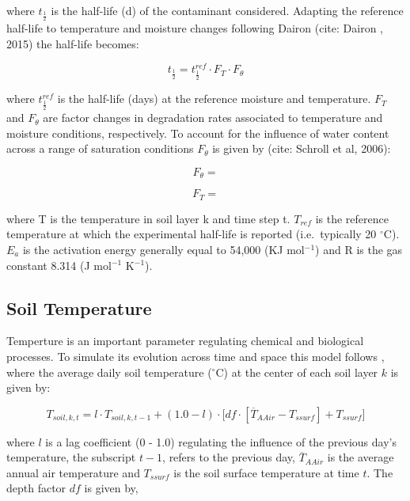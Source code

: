 \documentclass[]{article}
\begin{document}
where \(t_\frac{1}{2}\) is the half-life (d) of the contaminant
considered. Adapting the reference half-life to temperature and moisture
changes following Dairon (cite: Dairon , 2015) the half-life becomes:

\begin{equation}
t_\frac{1}{2}=t_\frac{1}{2}^{ref}\cdot F_T \cdot F_\theta
\label{eq:DT50} 
\end{equation}

where \(t_\frac{1}{2}^{ref}\) is the half-life (days) at the reference
moisture and temperature. \(F_T\) and \(F_\theta\) are factor changes in
degradation rates associated to temperature and moisture conditions,
respectively. To account for the influence of water content across a
range of saturation conditions \(F_\theta\) is given by (cite: Schroll
et al, 2006):

\begin{equation} 
F_\theta = 
\end{equation}

\begin{equation} 
F_T =
\end{equation}

where T is the temperature in soil layer k and time step t. \(T_{ref}\)
is the reference temperature at which the experimental half-life is
reported (i.e.~typically 20 \(^{\circ}\)C). \(E_a\) is the activation
energy generally equal to 54,000 (KJ mol\(^{-1}\)) and R is the gas
constant 8.314 (J mol\(^{-1}\) K\(^{-1}\)).

\subsection{Soil Temperature}\label{soil-temperature}

Temperture is an important parameter regulating chemical and biological
processes. To simulate its evolution across time and space this model
follows \citep{Neitsch2009}, where the average daily soil temperature
(\(^{\circ}\)C) at the center of each soil layer \(k\) is given by:

\begin{equation}
T_{soil, k, t} = l \cdot T_{soil, k, t-1} + (1.0 - l) \cdot \big[df \cdot [\overline{T}_{AAir} - T_{ssurf}]+T_{ssurf}]
\label{eq:tempSoil} 
\end{equation}

where \(l\) is a lag coefficient (0 - 1.0) regulating the influence of
the previous day's temperature, the subscript \(t-1\), refers to the
previous day, \(\overline{T}_{AAir}\) is the average annual air
temperature and \(T_{ssurf}\) is the soil surface temperature at time
\(t\). The depth factor \(df\) is given by,
\end{document}
